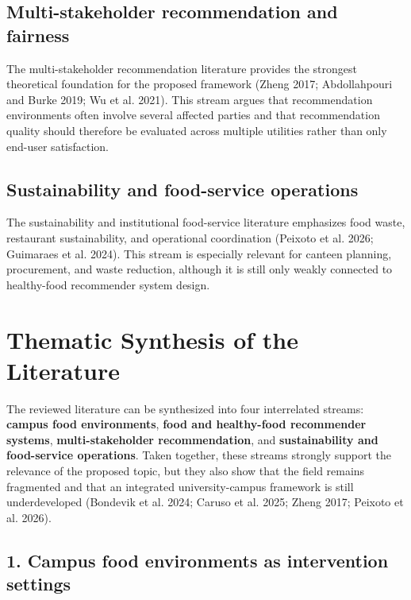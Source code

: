\documentclass[
  letterpaper,
  DIV=11,
  numbers=noendperiod]{scrartcl}
\begin{document}
\subsection{Multi-stakeholder recommendation and
fairness}\label{multi-stakeholder-recommendation-and-fairness}

The multi-stakeholder recommendation literature provides the strongest
theoretical foundation for the proposed framework (Zheng 2017;
Abdollahpouri and Burke 2019; {Wu et al.} 2021). This stream argues that
recommendation environments often involve several affected parties and
that recommendation quality should therefore be evaluated across
multiple utilities rather than only end-user satisfaction.

\subsection{Sustainability and food-service
operations}\label{sustainability-and-food-service-operations}

The sustainability and institutional food-service literature emphasizes
food waste, restaurant sustainability, and operational coordination
({Peixoto et al.} 2026; {Guimaraes et al.} 2024). This stream is
especially relevant for canteen planning, procurement, and waste
reduction, although it is still only weakly connected to healthy-food
recommender system design.

\section{Thematic Synthesis of the
Literature}\label{thematic-synthesis-of-the-literature}

The reviewed literature can be synthesized into four interrelated
streams: \textbf{campus food environments}, \textbf{food and
healthy-food recommender systems}, \textbf{multi-stakeholder
recommendation}, and \textbf{sustainability and food-service
operations}. Taken together, these streams strongly support the
relevance of the proposed topic, but they also show that the field
remains fragmented and that an integrated university-campus framework is
still underdeveloped ({Bondevik et al.} 2024; {Caruso et al.} 2025;
Zheng 2017; {Peixoto et al.} 2026).

\subsection{1. Campus food environments as intervention
settings}\label{campus-food-environments-as-intervention-settings}
\end{document}
